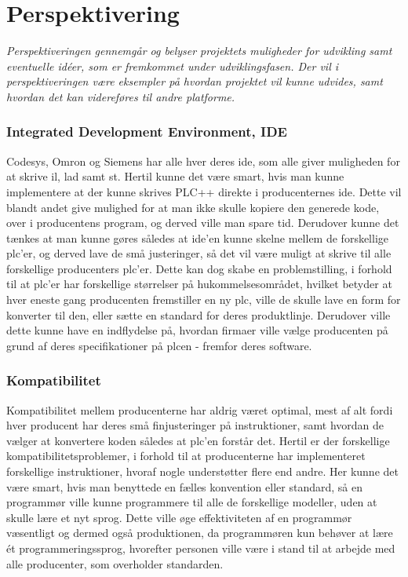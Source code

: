 \chapter{Perspektivering}
\label{sec:Perspektivering}
\textit{Perspektiveringen gennemgår og belyser projektets muligheder for udvikling samt eventuelle idéer, som er fremkommet under udviklingsfasen. Der vil i perspektiveringen være eksempler på hvordan projektet vil kunne udvides, samt hvordan det kan videreføres til andre platforme.}



\subsection*{Integrated Development Environment, IDE}
Codesys, Omron og Siemens har alle hver deres \gls{ide}, som alle giver muligheden for at skrive \gls{il}, \gls{lad} samt \gls{st}.
Hertil kunne det være smart, hvis man kunne implementere at der kunne skrives PLC++ direkte i producenternes \gls{ide}. Dette vil blandt andet give mulighed for at man ikke skulle kopiere den generede kode, over i producentens program, og derved ville man spare tid.
\noindent Derudover kunne det tænkes at man kunne gøres således at \gls{ide}'en kunne skelne mellem de forskellige \gls{plc}'er, og derved lave de små justeringer, så det vil være muligt at skrive til alle forskellige producenters \gls{plc}'er.
Dette kan dog skabe en problemstilling, i forhold til at \gls{plc}'er har forskellige størrelser på hukommelsesområdet, hvilket betyder at hver eneste gang producenten fremstiller en ny \gls{plc}, ville de skulle lave en form for konverter til den, eller sætte en standard for deres produktlinje.
Derudover ville dette kunne have en indflydelse på, hvordan firmaer ville vælge producenten på grund af deres specifikationer på \gls{plc}en - fremfor deres software.

\subsection*{Kompatibilitet}
Kompatibilitet mellem producenterne har aldrig været optimal, mest af alt fordi hver producent har deres små finjusteringer på instruktioner, samt hvordan de vælger at konvertere koden således at \gls{plc}'en forstår det.
Hertil er der forskellige kompatibilitetsproblemer, i forhold til at producenterne har implementeret forskellige instruktioner, hvoraf nogle understøtter flere end andre.
Her kunne det være smart, hvis man benyttede en fælles konvention eller standard, så en programmør ville kunne programmere til alle de forskellige modeller, uden at skulle lære et nyt sprog.
Dette ville øge effektiviteten af en programmør væsentligt og dermed også produktionen, da programmøren kun behøver at lære ét programmeringssprog, hvorefter personen ville være i stand til at arbejde med alle producenter, som overholder standarden.



